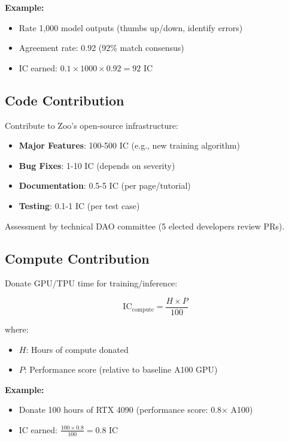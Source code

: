 \documentclass[11pt,letterpaper]{article}
\theoremstyle{definition}
\theoremstyle{remark}
\begin{document}
\textbf{Example:}
\begin{itemize}
\item Rate 1,000 model outputs (thumbs up/down, identify errors)
\item Agreement rate: 0.92 (92\% match consensus)
\item IC earned: $0.1 \times 1000 \times 0.92 = 92$ IC
\end{itemize}

\subsection{Code Contribution}

Contribute to Zoo's open-source infrastructure:

\begin{itemize}
\item \textbf{Major Features}: 100-500 IC (e.g., new training algorithm)
\item \textbf{Bug Fixes}: 1-10 IC (depends on severity)
\item \textbf{Documentation}: 0.5-5 IC (per page/tutorial)
\item \textbf{Testing}: 0.1-1 IC (per test case)
\end{itemize}

Assessment by technical DAO committee (5 elected developers review PRs).

\subsection{Compute Contribution}

Donate GPU/TPU time for training/inference:

\begin{equation}
\text{IC}_{\text{compute}} = \frac{H \times P}{100}
\end{equation}

where:
\begin{itemize}
\item $H$: Hours of compute donated
\item $P$: Performance score (relative to baseline A100 GPU)
\end{itemize}

\textbf{Example:}
\begin{itemize}
\item Donate 100 hours of RTX 4090 (performance score: 0.8× A100)
\item IC earned: $\frac{100 \times 0.8}{100} = 0.8$ IC
\end{itemize}
\end{document}
